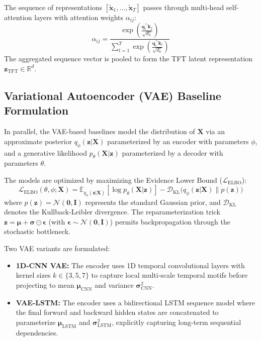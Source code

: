 \documentclass[12pt,a4paper]{report}
\begin{document}
The sequence of representations $[\tilde{\mathbf{x}}_1, \dots, \tilde{\mathbf{x}}_T]$ passes through multi-head self-attention layers with attention weights $\alpha_{ij}$:
\begin{equation}
    \alpha_{ij} = \frac{\exp\left( \frac{\mathbf{q}_i^\top \mathbf{k}_j}{\sqrt{d_k}} \right)}{\sum_{l=1}^T \exp\left( \frac{\mathbf{q}_i^\top \mathbf{k}_l}{\sqrt{d_k}} \right)}
\end{equation}
The aggregated sequence vector is pooled to form the TFT latent representation $\mathbf{z}_{\text{TFT}} \in \mathbb{R}^d$.

\subsection{Variational Autoencoder (VAE) Baseline Formulation}
In parallel, the VAE-based baselines model the distribution of $\mathbf{X}$ via an approximate posterior $q_\phi(\mathbf{z}|\mathbf{X})$ parameterized by an encoder with parameters $\phi$, and a generative likelihood $p_\theta(\mathbf{X}|\mathbf{z})$ parameterized by a decoder with parameters $\theta$.

The models are optimized by maximizing the Evidence Lower Bound ($\mathcal{L}_{\text{ELBO}}$):
\begin{equation}
    \mathcal{L}_{\text{ELBO}}(\theta, \phi; \mathbf{X}) = \mathbb{E}_{q_\phi(\mathbf{z}|\mathbf{X})}[\log p_\theta(\mathbf{X}|\mathbf{z})] - \mathcal{D}_{\text{KL}}\big(q_\phi(\mathbf{z}|\mathbf{X}) \parallel p(\mathbf{z})\big)
\end{equation}
where $p(\mathbf{z}) = \mathcal{N}(\mathbf{0}, \mathbf{I})$ represents the standard Gaussian prior, and $\mathcal{D}_{\text{KL}}$ denotes the Kullback-Leibler divergence. The reparameterization trick $\mathbf{z} = \boldsymbol{\mu} + \boldsymbol{\sigma} \odot \boldsymbol{\epsilon}$ (with $\boldsymbol{\epsilon} \sim \mathcal{N}(\mathbf{0}, \mathbf{I})$) permits backpropagation through the stochastic bottleneck.

Two VAE variants are formulated:
\begin{itemize}
    \item \textbf{1D-CNN VAE:} The encoder uses 1D temporal convolutional layers with kernel sizes $k \in \{3, 5, 7\}$ to capture local multi-scale temporal motifs before projecting to mean $\boldsymbol{\mu}_{\text{CNN}}$ and variance $\boldsymbol{\sigma}_{\text{CNN}}^2$.
    \item \textbf{VAE-LSTM:} The encoder uses a bidirectional LSTM sequence model where the final forward and backward hidden states are concatenated to parameterize $\boldsymbol{\mu}_{\text{LSTM}}$ and $\boldsymbol{\sigma}_{\text{LSTM}}^2$, explicitly capturing long-term sequential dependencies.
\end{itemize}
\end{document}
